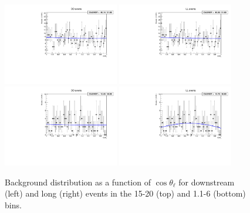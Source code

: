 \begin{figure}[h]
\centering
\includegraphics[width=0.45\textwidth]{Lmumu/figs/AngularBkgFits/BkgFit_highq2_DD.pdf}
\includegraphics[width=0.45\textwidth]{Lmumu/figs/AngularBkgFits/BkgFit_highq2_LL.pdf}
\includegraphics[width=0.45\textwidth]{Lmumu/figs/AngularBkgFits/BkgFit_lowq2_DD.pdf}
\includegraphics[width=0.45\textwidth]{Lmumu/figs/AngularBkgFits/BkgFit_lowq2_LL.pdf}
\caption{Background distribution as a function of $\cos\theta_\ell$ for downstream (left) and long (right)
events in the 15-20 \gevgevcccc (top) and 1.1-6 \gevgevcccc (bottom) \qsq bins.  }
\label{fig:cosThetaLbkg}
\end{figure}

